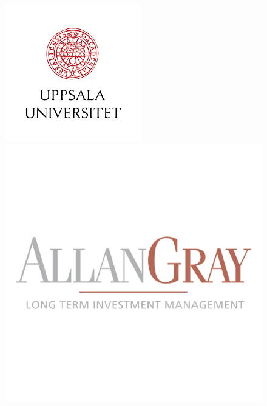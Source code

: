 \documentclass[12pt]{article}
\begin{document}
\begin{titlepage}

\begin{figure}
   \begin{minipage}{0.48\textwidth}
   \begin{flushleft}
     \includegraphics[scale=0.5]{Images/UU_LOGO.png}
   \end{flushleft}
   \end{minipage}\hfill
   \begin{minipage}{0.48\textwidth}
   \begin{flushright}
     \includegraphics[scale=0.075]{Images/Allan Gray.png}
   \end{flushright}
   \end{minipage}
\end{figure}


\end{titlepage}
\end{document}

